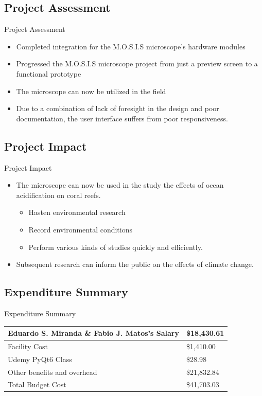 \documentclass[17pt, aspectratio=169]{beamer}
\begin{document}
\subsection{Project Assessment}
\begin{frame}{Project Assessment}
	\begin{itemize}
		\item Completed integration for the M.O.S.I.S microscope's hardware modules
		\item Progressed the M.O.S.I.S microscope project from just a preview screen to a functional prototype
		\item The microscope can now be utilized in the field
		\item Due to a combination of lack of foresight in the design and poor documentation, the user interface suffers from poor responsiveness.
	\end{itemize}
\end{frame}
\subsection*{Project Impact}
\begin{frame}{Project Impact}
	\begin{itemize}
		\item The microscope can now be used in the study the effects of ocean acidification on coral reefs.
		      \begin{itemize}
			      \item Hasten environmental research
			      \item Record environmental conditions
			      \item Perform various kinds of studies quickly and efficiently.
		      \end{itemize}
		\item Subsequent research can inform the public on the effects of climate change.
	\end{itemize}
\end{frame}
\subsection*{Expenditure Summary}
\begin{frame}{Expenditure Summary}
	\begin{center}
		\begin{tabular}{||m{} | m{} ||}
			\hline
			Eduardo S. Miranda \& Fabio J. Matos's Salary & \$18,430.61 \\
			\hline
			Facility Cost                                 & \$1,410.00  \\
			\hline
			Udemy PyQt6 Class                             & \$28.98     \\
			\hline
			Other benefits and overhead                   & \$21,832.84 \\
			\hline
			Total Budget Cost                             & \$41,703.03 \\
			\hline
		\end{tabular}
	\end{center}
\end{frame}
\end{document}
